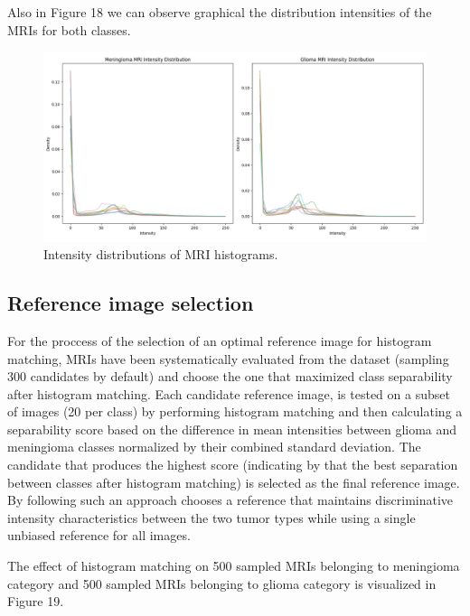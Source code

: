 \documentclass[11pt,a4paper]{article}
\begin{document}
Also in Figure 18 we can observe graphical the distribution intensities of the MRIs for both classes.
		\begin{figure}[H]
			\centering
			\includegraphics[width=1.0\textwidth]{images/Unmatched_intensity_distributions.png}
			\caption{Intensity distributions of MRI histograms.}
			\label{fig1:}
		\end{figure}		




\subsection{Reference image selection}

For the proccess of the selection of an optimal reference image for histogram matching, MRIs have been systematically evaluated
from the dataset (sampling 300 candidates by default) and choose the one that maximized class separability after histogram matching.
Each candidate reference image, is tested on a subset of images (20 per class) 
by performing histogram matching and then calculating a separability score based on the 
difference in mean intensities between glioma and meningioma classes 
normalized by their combined standard deviation. The candidate that produces the highest score (indicating by that
the best separation between classes after histogram matching) is selected as the final reference image. 
By following such an approach chooses a reference that maintains discriminative 
intensity characteristics between the two tumor types while using a single unbiased 
reference for all images.

The effect of histogram matching on 500 sampled MRIs belonging to meningioma category and 500 sampled MRIs belonging to glioma category is 
visualized in Figure 19.
\end{document}
